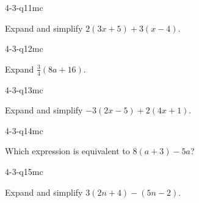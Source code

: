 \begin{practiceQuestion}{4-3-q11}{mc}
\begin{questionText}
Expand and simplify $2(3x + 5) + 3(x - 4)$.
\end{questionText}
\end{practiceQuestion}

\begin{practiceQuestion}{4-3-q12}{mc}
\begin{questionText}
Expand $\frac{3}{4}(8a + 16)$.
\end{questionText}
\end{practiceQuestion}

\begin{practiceQuestion}{4-3-q13}{mc}
\begin{questionText}
Expand and simplify $-3(2x - 5) + 2(4x + 1)$.
\end{questionText}
\end{practiceQuestion}

\begin{practiceQuestion}{4-3-q14}{mc}
\begin{questionText}
Which expression is equivalent to $8(a + 3) - 5a$?
\end{questionText}
\end{practiceQuestion}

\begin{practiceQuestion}{4-3-q15}{mc}
\begin{questionText}
Expand and simplify $3(2n + 4) - (5n - 2)$.
\end{questionText}
\end{practiceQuestion}

